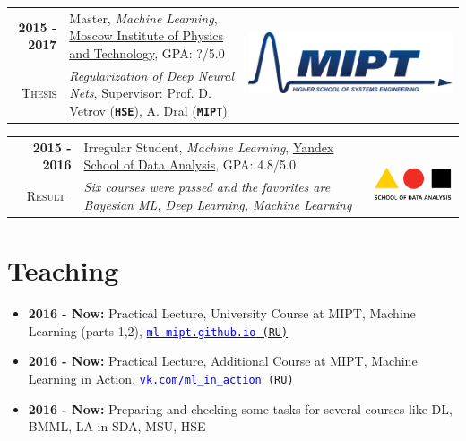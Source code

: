 \documentclass[a4paper,10pt]{article} %
\begin{document}
\begin{tabular}{rp{14cm}c}	
\textbf{2015 -  2017} & Master, \emph{Machine Learning}, \href{https://mipt.ru/english}{Moscow Institute of Physics and Technology}, GPA: ?/5.0& \multirow{2}{*}{\includegraphics[scale=0.15]{img/mipt}}\\
\textsc{Thesis} & \emph{Regularization of Deep Neural Nets}, Supervisor: \href{https://www.hse.ru/staff/dvetrov}{Prof. D. Vetrov (\texttt{\textbf{HSE}})}, \href{https://ru.linkedin.com/in/alexey-dral}{A. Dral (\texttt{\textbf{MIPT}})}
\end{tabular}

\begin{tabular}{rp{14cm}c}	
\textbf{2015 -  2016} & Irregular Student, \emph{Machine Learning}, \href{https://yandexdataschool.com/}{Yandex School of Data Analysis}, GPA: 4.8/5.0& \multirow{2}{*}{~~\includegraphics[scale=0.25]{img/shad}}\\
\textsc{Result}~& \emph{Six courses were passed and the favorites are Bayesian ML, Deep Learning, Machine Learning}
\end{tabular}

\section{Teaching}
\begin{itemize}
	\item \textbf{2016 - Now:} Practical Lecture, University Course at MIPT, Machine Learning (parts 1,2), \href{https://ml-mipt.github.io/}{\texttt{\textcolor{blue}{ml-mipt.github.io} (RU)}}
	\item \textbf{2016 - Now:} Practical Lecture, Additional Course at MIPT, Machine Learning in Action, \href{https://vk.com/data_mining_in_action}{\texttt{\textcolor{blue}{vk.com/ml\_in\_action} (RU)}}
	\item \textbf{2016 - Now:} Preparing and checking some tasks for several courses like DL, BMML, LA in SDA, MSU, HSE
\end{itemize}
\end{document}
